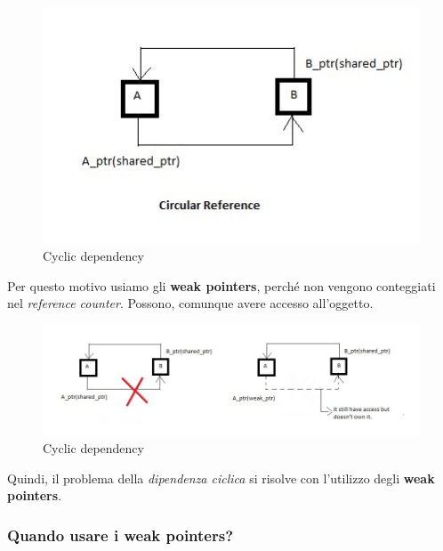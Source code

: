\begin{figure}[H]
	\centering
	\includegraphics[width=1\textwidth, height=1\textheight, keepaspectratio]{./imgs/shared_ptr_problem_cyclic_dependency.jpg}
	\caption{Cyclic dependency}
	\label{fig:shared_ptr_problem_cyclic_dependency}
\end{figure}

\textsf{\small Per questo motivo usiamo gli \textbf{weak pointers}, perché non vengono conteggiati nel \emph{reference counter}. Possono, comunque avere accesso all'oggetto.} \\

\begin{figure}[H]
	\centering
	\includegraphics[width=1\textwidth, height=1\textheight, keepaspectratio]{./imgs/shared_ptr_problem_cyclic_dependency2.jpg}
	\caption{Cyclic dependency}
	\label{fig:shared_ptr_problem_cyclic_dependency2}
\end{figure}

\textsf{\small Quindi, il problema della \emph{dipendenza ciclica} si risolve con l'utilizzo degli \textbf{weak pointers}.} \\

\subsubsection{Quando usare i weak pointers?}

